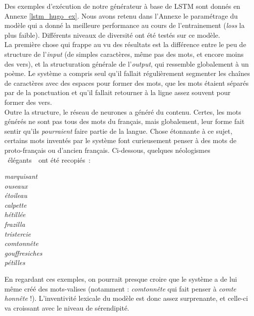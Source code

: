 \documentclass{article}
\newenvironment{citationbox}
{\begin{center}
		\begin{minipage}{.8\textwidth}
		}
		{
		\end{minipage}	
\end{center}
}
\begin{document}
					Des exemples d'exécution de notre générateur à base de LSTM sont donnés en Annexe \ref{lstm_hugo_ex}. Nous avons retenu dans l'Annexe le paramétrage du modèle qui a donné la meilleure performance  au cours de l'entrainement (\textit{loss} la plus faible). Différents niveaux de diversité ont été testés sur ce modèle.\\
					
					La première chose qui frappe au vu des résultats est la différence entre le peu de structure de l'\textit{input} (de simples caractères, même pas des mots, et encore moins des vers), et la structuration générale de l'\textit{output}, qui ressemble globalement à un poème. Le système a compris seul qu'il fallait régulièrement segmenter les chaînes de caractères avec des espaces pour former des mots, que les mots étaient séparés par de la ponctuation et qu'il fallait retourner à la ligne assez souvent pour former des vers.\\
					
					Outre la structure, le réseau de neurones a généré du contenu. Certes, les mots générés ne sont pas tous des mots du français, mais globalement, leur forme fait sentir qu'ils \textit{pourraient} faire partie de la langue. Chose étonnante à ce sujet, certains mots inventés par le système font curieusement penser à des mots de proto-français ou d'ancien français. Ci-dessous, quelques néologismes \guillemotleft~élégants~\guillemotright~ont été recopiés~:
					\begin{citationbox}
						\textit{marquisant}\\
						\textit{ouseaux}\\
						\textit{étoileau}\\
						\textit{calpette}\\
						\textit{hétillée}\\
						\textit{frazilla}\\
						\textit{tristercie}\\
						\textit{comtonnête}\\
						\textit{gouffresiches}\\
						\textit{pétilles}\\
					\end{citationbox}
					En regardant ces exemples, on pourrait presque croire que le système a de lui même créé des mots-valises (notamment : \textit{comtonnête} qui fait penser à \textit{comte} \textit{honnête} !). L'inventivité lexicale du modèle est donc assez surprenante, et celle-ci va croissant avec le niveau de sérendipité.\\
					
\end{document}
